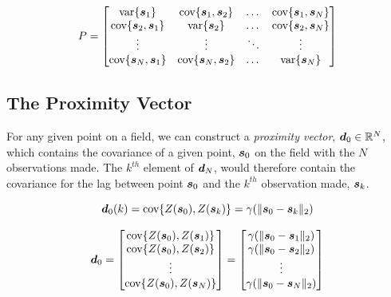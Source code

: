 \documentclass[11pt]{ucthesis}
\newcommand{\vect}[1]{{\it{\boldsymbol{#1}}}}
\begin{document}
\begin{equation}
    P = \begin{bmatrix} 

    \text{var}\{\vect{s}_1\} & \text{cov}\{\vect{s}_1, \vect{s}_2\} & \dots & \text{cov}\{\vect{s}_1, \vect{s}_N\} \\
    
    \text{cov}\{\vect{s}_2, \vect{s}_1\} & \text{var}\{\vect{s}_2\} & \dots & \text{cov}\{\vect{s}_2, \vect{s}_N\} \\

    \vdots & \vdots & \ddots & \vdots  \\
    
    \text{cov}\{\vect{s}_N, \vect{s}_1\} & \text{cov}\{\vect{s}_N, \vect{s}_2\} & \dots & \text{var}\{\vect{s}_N\} \\

    \end{bmatrix}
    \label{eq:covvarmat}
\end{equation}

\subsection{The Proximity Vector}
For any given point on a field, we can construct a \textit{proximity vector}, $\vect{d}_0 \in \mathbb{R}^N$, which contains the covariance of a given point, $\vect{s}_0$ on the field with the $N$ observations made. The $k^{th}$ element of $\vect{d}_N$, would therefore contain the covariance for the lag between point $\vect{s}_0$ and the $k^{th}$ observation made, $\vect{s}_k$.

$$\vect{d}_0(k) = \text{cov}\{Z(\vect{s}_0), Z(\vect{s}_k)\} = \gamma(\| \vect{s}_0 - \vect{s}_k \|_2)$$

\begin{equation}
    \vect{d}_0 = \begin{bmatrix} 
                    \text{cov}\{Z(\vect{s}_0), Z(\vect{s}_1)\} \\
                    \text{cov}\{Z(\vect{s}_0), Z(\vect{s}_2)\} \\
                     \vdots \\
                    \text{cov}\{Z(\vect{s}_0), Z(\vect{s}_N)\} \\
        \end{bmatrix} = 
        \begin{bmatrix} 
                    \gamma(\| \vect{s}_0 - \vect{s}_1 \|_2) \\
                    \gamma(\| \vect{s}_0 - \vect{s}_2 \|_2) \\
                     \vdots \\
                    \gamma(\| \vect{s}_0 - \vect{s}_N \|_2) \\
        \end{bmatrix} 
    \label{eq:proxvect}
\end{equation}
\end{document}
